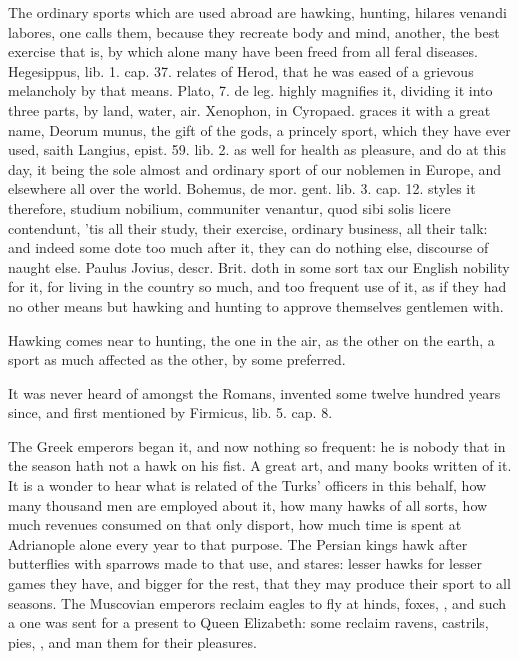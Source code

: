 {The ordinary sports which are used abroad are hawking, hunting, hilares
venandi labores, one calls them, because they recreate body and
mind, another, the best exercise that is, by which alone
many have been freed from all feral diseases. Hegesippus, lib. 1.
cap. 37. relates of Herod, that he was eased of a grievous melancholy
by that means. Plato, 7. de leg. highly magnifies it, dividing it into
three parts, by land, water, air. Xenophon, in Cyropaed. graces it with
a great name, Deorum munus, the gift of the gods, a princely sport,
which they have ever used, saith Langius, epist. 59. lib. 2. as well
for health as pleasure, and do at this day, it being the sole almost
and ordinary sport of our noblemen in Europe, and elsewhere all over
the world. Bohemus, de mor. gent. lib. 3. cap. 12. styles it therefore,
studium nobilium, communiter venantur, quod sibi solis licere
contendunt, 'tis all their study, their exercise, ordinary business,
all their talk: and indeed some dote too much after it, they can do
nothing else, discourse of naught else. Paulus Jovius, descr. Brit.
doth in some sort tax our  English nobility for it, for living in
the country so much, and too frequent use of it, as if they had no
other means but hawking and hunting to approve themselves gentlemen
with.

Hawking comes near to hunting, the one in the air, as the other on the
earth, a sport as much affected as the other, by some preferred.

It was never heard of amongst the Romans, invented some twelve
hundred years since, and first mentioned by Firmicus, lib. 5. cap. 8.

The Greek emperors began it, and now nothing so frequent: he is nobody
that in the season hath not a hawk on his fist. A great art, and many
books written of it. It is a wonder to hear what is related
of the Turks' officers in this behalf, how many thousand men are
employed about it, how many hawks of all sorts, how much revenues
consumed on that only disport, how much time is spent at Adrianople
alone every year to that purpose. The Persian kings hawk after
butterflies with sparrows made to that use, and stares: lesser hawks
for lesser games they have, and bigger for the rest, that they may
produce their sport to all seasons. The Muscovian emperors reclaim
eagles to fly at hinds, foxes, \etc{}, and such a one was sent for a
present to Queen Elizabeth: some reclaim ravens, castrils, pies,
\etc{}, and man them for their pleasures.

}
